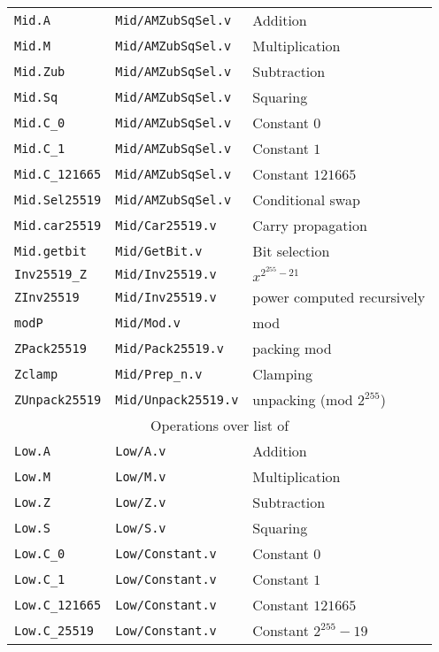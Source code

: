 \begin{table}[h]
\begin{tabular}{ l | l | l }
    \hline
    \texttt{Mid.A} & \texttt{Mid/AMZubSqSel.v} & Addition \\
    \texttt{Mid.M} & \texttt{Mid/AMZubSqSel.v} & Multiplication \\
    \texttt{Mid.Zub} & \texttt{Mid/AMZubSqSel.v} & Subtraction \\
    \texttt{Mid.Sq} & \texttt{Mid/AMZubSqSel.v} & Squaring \\
    \texttt{Mid.C\_0} & \texttt{Mid/AMZubSqSel.v} & Constant $0$ \\
    \texttt{Mid.C\_1} & \texttt{Mid/AMZubSqSel.v} & Constant $1$ \\
    \texttt{Mid.C\_121665} & \texttt{Mid/AMZubSqSel.v} & Constant $121665$ \\
    \texttt{Mid.Sel25519} & \texttt{Mid/AMZubSqSel.v} & Conditional swap \\
    \texttt{Mid.car25519} & \texttt{Mid/Car25519.v} & Carry propagation \\
    \texttt{Mid.getbit} & \texttt{Mid/GetBit.v} & Bit selection \\
    \texttt{Inv25519\_Z} & \texttt{Mid/Inv25519.v} & $x^{2^{255}-21}$ \\
    \texttt{ZInv25519} & \texttt{Mid/Inv25519.v} & power computed recursively \\
    \texttt{modP} & \texttt{Mid/Mod.v} & mod \p\\
    \texttt{ZPack25519} & \texttt{Mid/Pack25519.v} & packing mod \p\\
    \texttt{Zclamp} & \texttt{Mid/Prep\_n.v} & Clamping \\
    \texttt{ZUnpack25519} & \texttt{Mid/Unpack25519.v} & unpacking (mod $2^{255}$)\\
    \hline
    \multicolumn{3}{c}{Operations over list of \Z}\\
    \hline
    \texttt{Low.A} & \texttt{Low/A.v} & Addition \\
    \texttt{Low.M} & \texttt{Low/M.v} & Multiplication \\
    \texttt{Low.Z} & \texttt{Low/Z.v} & Subtraction \\
    \texttt{Low.S} & \texttt{Low/S.v} & Squaring \\
    \texttt{Low.C\_0} & \texttt{Low/Constant.v} & Constant $0$ \\
    \texttt{Low.C\_1} & \texttt{Low/Constant.v} & Constant $1$\\
    \texttt{Low.C\_121665} & \texttt{Low/Constant.v} & Constant $121665$\\
    \texttt{Low.C\_25519} & \texttt{Low/Constant.v} & Constant $2^{255}-19$\\

\end{tabular}
\end{table}
